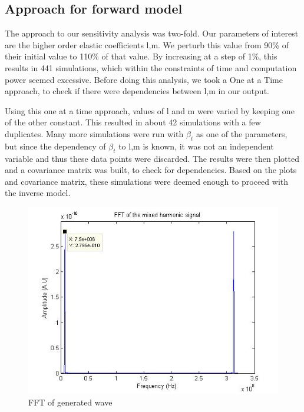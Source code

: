 \subsection{Approach for forward model}
The approach to our sensitivity analysis was two-fold. Our parameters of interest are the higher order elastic coefficients l,m. We perturb this value from 90\% of their initial value to 110\% of that value. By increasing at a step of 1\%, this results in 441 simulations, which within the constraints of time and computation power seemed excessive. Before doing this analysis, we took a One at a Time approach, to check if there were dependencies between l,m in our output. 

Using this one at a time approach, values of l and m were varied by keeping one of the other constant. This resulted in about 42 simulations with a few duplicates. Many more simulations were run with $\beta_t$ as one of the parameters, but since the dependency of  $\beta_t$ to l,m is known, it was not an independent variable and thus these data points were discarded. The results were then plotted and a covariance matrix was built, to check for dependencies. Based on the plots and covariance matrix, these simulations were deemed enough to proceed with the inverse model.

\begin{figure}
\begin{center}
\includegraphics[scale=0.5]{images/chapter_4/finaLfft_nozzom.jpg}
\caption{FFT of generated wave}
\end{center}
\end{figure}

